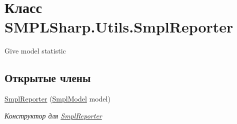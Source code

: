 \hypertarget{class_s_m_p_l_sharp_1_1_utils_1_1_smpl_reporter}{\section{Класс S\-M\-P\-L\-Sharp.\-Utils.\-Smpl\-Reporter}
\label{d2/d18/class_s_m_p_l_sharp_1_1_utils_1_1_smpl_reporter}
}


Give model statistic  


\subsection*{Открытые члены}
\begin{DoxyCompactItemize}
\item 
\hyperlink{class_s_m_p_l_sharp_1_1_utils_1_1_smpl_reporter_ae6b7e1ab446c06fc292a459ae1719722}{Smpl\-Reporter} (\hyperlink{class_s_m_p_l_sharp_1_1_smpl_model}{Smpl\-Model} model)
\begin{DoxyCompactList}\small\item\em Конструктор для \hyperlink{class_s_m_p_l_sharp_1_1_utils_1_1_smpl_reporter}{Smpl\-Reporter} \end{DoxyCompactList}\end{DoxyCompactItemize}
